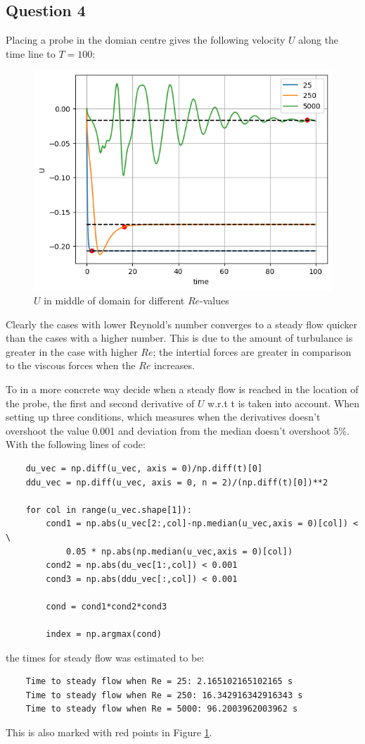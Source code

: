 \documentclass[10pt]{report}
\begin{document}
\subsection*{Question 4}
Placing a probe in the domian centre gives the following velocity $U$ along the time line to $T = 100$:
\begin{figure}[H]
    \centering
    \includegraphics[width = \textwidth]{plots/plot1.png}
    \caption{$U$ in middle of domain for different $Re$-values}
    \label{plot1}
\end{figure}
Clearly the cases with lower Reynold's number converges to a steady flow quicker than the cases with
a higher number. This is due to the amount of turbulance is greater in the case with higher $Re$; 
the intertial forces are greater in comparison to the viscous forces when the $Re$ increases.

To in a more concrete way decide when a steady flow is reached in the location of the probe, the first and second derivative
of $U$ w.r.t t is taken into account. When setting up three conditions, which measures when the derivatives
doesn't overshoot the value 0.001 and deviation from the median doesn't overshoot 5\%. With the following lines of code:
\begin{lstlisting}
    du_vec = np.diff(u_vec, axis = 0)/np.diff(t)[0]
    ddu_vec = np.diff(u_vec, axis = 0, n = 2)/(np.diff(t)[0])**2

    for col in range(u_vec.shape[1]):
        cond1 = np.abs(u_vec[2:,col]-np.median(u_vec,axis = 0)[col]) < \
            0.05 * np.abs(np.median(u_vec,axis = 0)[col])
        cond2 = np.abs(du_vec[1:,col]) < 0.001
        cond3 = np.abs(ddu_vec[:,col]) < 0.001

        cond = cond1*cond2*cond3

        index = np.argmax(cond)
\end{lstlisting}
the times for steady flow was estimated to be:
\begin{lstlisting}
    Time to steady flow when Re = 25: 2.165102165102165 s
    Time to steady flow when Re = 250: 16.342916342916343 s
    Time to steady flow when Re = 5000: 96.2003962003962 s
\end{lstlisting}
This is also marked with red points in Figure \ref{plot1}.
\end{document}
